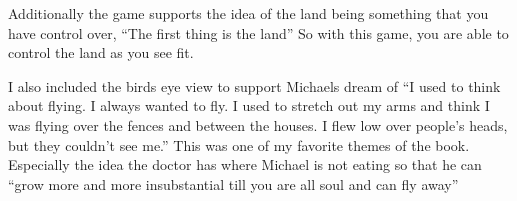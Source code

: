 \documentclass{article}
\begin{document}
Additionally the game supports the idea of the land being something that you have control over, ``The first thing is the land'' So with this game, you are able to control the land as you see fit. 

I also included the birds eye view to support Michaels dream of ``I used to think about flying. I always wanted to fly. I used to stretch out my arms and think I was flying over the fences and between the houses. I flew low over people's heads, but they couldn't see me.'' This was one of my favorite themes of the book. Especially the idea the doctor has where Michael is not eating so that he can ``grow more and more insubstantial till you are all soul and can fly away''
\end{document}
